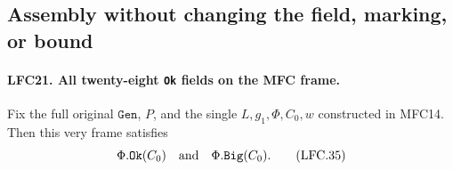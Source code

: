 \subsection{Assembly without changing the field, marking, or bound}

\paragraph{LFC21. All twenty-eight \texttt{Ok} fields on the MFC frame.}
\label{claim:LFC21}
Fix the full original \(\texttt{Gen}\), \(P\), and the
single \(L,g_1,\Phi,C_0,w\) constructed in MFC14.
Then this very frame satisfies
\[
                         \Phi.\texttt{Ok}(C_0)
                    \quad\hbox{and}\quad
                         \Phi.\texttt{Big}(C_0).          \tag{LFC.35}
\]

